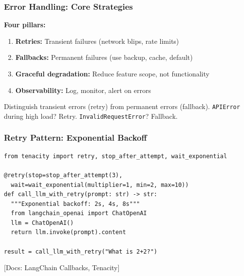 \documentclass[aspectratio=169,11pt]{beamer}
\newcommand{\docref}[1]{{\scriptsize\color{docgray}[Docs: #1]}}
\begin{document}
\begin{frame}
\frametitle{Error Handling: Core Strategies}

\small\textbf{Four pillars:}
\begin{enumerate}
  \setlength{\itemsep}{2pt}
  \item \textbf{Retries:} Transient failures (network blips, rate limits)
  \item \textbf{Fallbacks:} Permanent failures (use backup, cache, default)
  \item \textbf{Graceful degradation:} Reduce feature scope, not functionality
  \item \textbf{Observability:} Log, monitor, alert on errors
\end{enumerate}

\vspace{0.5em}

\begin{tipbox}
  \small Distinguish transient errors (retry) from permanent errors (fallback). \texttt{APIError} during high load? Retry. \texttt{InvalidRequestError}? Fallback.
\end{tipbox}

\end{frame}

\begin{frame}[fragile]
\frametitle{Retry Pattern: Exponential Backoff}
\vspace{-0.3cm}

\begin{lstlisting}
from tenacity import retry, stop_after_attempt, wait_exponential

@retry(stop=stop_after_attempt(3),
  wait=wait_exponential(multiplier=1, min=2, max=10))
def call_llm_with_retry(prompt: str) -> str:
  """Exponential backoff: 2s, 4s, 8s"""
  from langchain_openai import ChatOpenAI
  llm = ChatOpenAI()
  return llm.invoke(prompt).content

result = call_llm_with_retry("What is 2+2?")
\end{lstlisting}

\docref{LangChain Callbacks, Tenacity}
\vspace{-0.15cm}

\end{frame}
\end{document}
